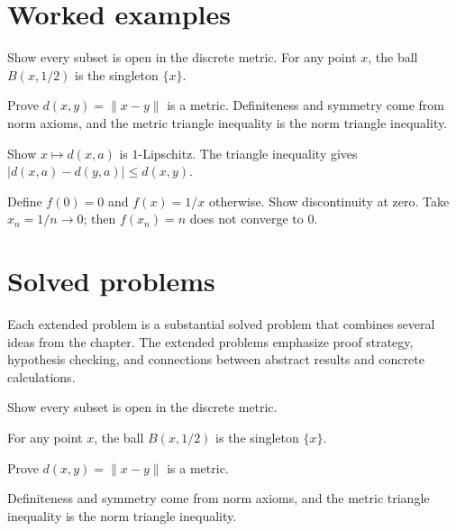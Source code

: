 \section{Worked examples}

\begin{example}\label{ex:ii05-worked-01}
Show every subset is open in the discrete metric. For any point $x$, the ball $B(x,1/2)$ is the singleton $\{x\}$.
\end{example}

\begin{example}\label{ex:ii05-worked-02}
Prove $d(x,y)=\|x-y\|$ is a metric. Definiteness and symmetry come from norm axioms, and the metric triangle inequality is the norm triangle inequality.
\end{example}

\begin{example}\label{ex:ii05-worked-03}
Show $x\mapsto d(x,a)$ is $1$-Lipschitz. The triangle inequality gives $|d(x,a)-d(y,a)|\le d(x,y)$.
\end{example}

\begin{example}\label{ex:ii05-worked-04}
Define $f(0)=0$ and $f(x)=1/x$ otherwise. Show discontinuity at zero. Take $x_n=1/n\to0$; then $f(x_n)=n$ does not converge to $0$.
\end{example}

\section{Solved problems}
Each extended problem is a substantial solved problem that combines several ideas from the chapter. The extended problems emphasize proof strategy, hypothesis checking, and connections between abstract results and concrete calculations.

\begin{problem}\label{prob:ii05-problem-01}
Show every subset is open in the discrete metric.
\end{problem}
\begin{solution}
For any point $x$, the ball $B(x,1/2)$ is the singleton $\{x\}$.
\end{solution}

\begin{problem}\label{prob:ii05-problem-02}
Prove $d(x,y)=\|x-y\|$ is a metric.
\end{problem}
\begin{solution}
Definiteness and symmetry come from norm axioms, and the metric triangle inequality is the norm triangle inequality.
\end{solution}

